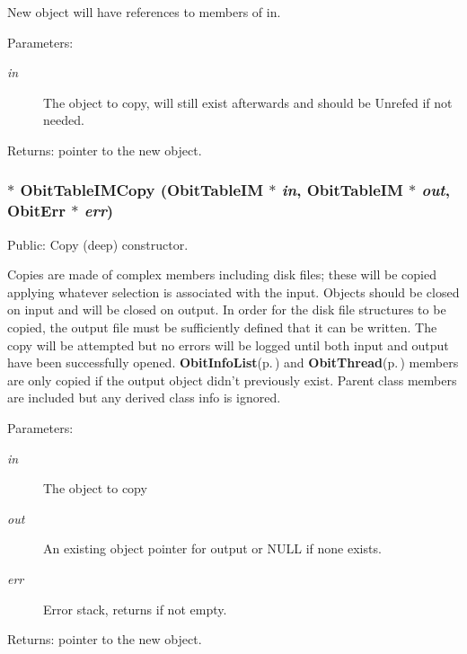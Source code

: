 New object will have references to members of in. \begin{Desc}
\item[Parameters:]
\begin{description}
\item[{\em in}]The object to copy, will still exist afterwards and should be Unrefed if not needed. \end{description}
\end{Desc}
\begin{Desc}
\item[Returns:]pointer to the new object. \end{Desc}
\subsubsection{$\ast$ Obit\-Table\-IMCopy ({\bf Obit\-Table\-IM} $\ast$ {\em in}, {\bf Obit\-Table\-IM} $\ast$ {\em out}, {\bf Obit\-Err} $\ast$ {\em err})}\label{ObitTableIM_8c_a20}


Public: Copy (deep) constructor. 

Copies are made of complex members including disk files; these will be copied applying whatever selection is associated with the input. Objects should be closed on input and will be closed on output. In order for the disk file structures to be copied, the output file must be sufficiently defined that it can be written. The copy will be attempted but no errors will be logged until both input and output have been successfully opened. {\bf Obit\-Info\-List}{\rm (p.\,\pageref{structObitInfoList})} and {\bf Obit\-Thread}{\rm (p.\,\pageref{structObitThread})} members are only copied if the output object didn't previously exist. Parent class members are included but any derived class info is ignored. \begin{Desc}
\item[Parameters:]
\begin{description}
\item[{\em in}]The object to copy \item[{\em out}]An existing object pointer for output or NULL if none exists. \item[{\em err}]Error stack, returns if not empty. \end{description}
\end{Desc}
\begin{Desc}
\item[Returns:]pointer to the new object. \end{Desc}
